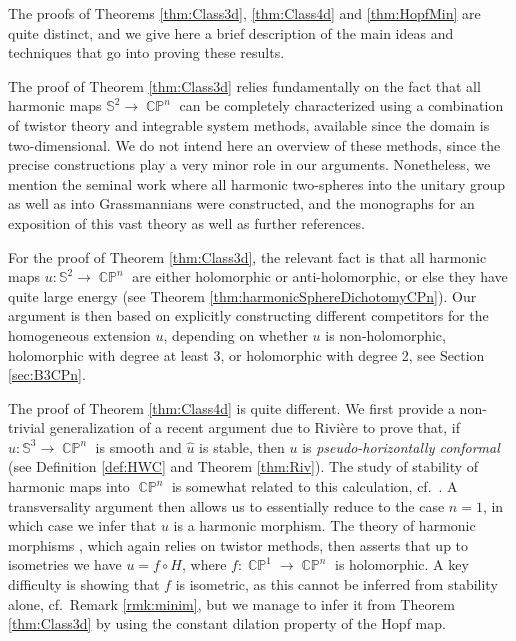\documentclass[11pt]{article}
\theoremstyle{plain}
\numberwithin{equation}{section}
\theoremstyle{definition}
\def \mb{\mathbb}
\DeclareMathOperator{\CP}{\mathbb{CP}}
\begin{document}
\medskip

The proofs of Theorems \ref{thm:Class3d}, \ref{thm:Class4d} and \ref{thm:HopfMin} are quite distinct, and we give here a brief description of the main ideas and techniques  that go into proving these results. 

The proof of Theorem \ref{thm:Class3d} relies fundamentally on the fact that all harmonic maps $\mb S^2\to \CP^n$ can be completely characterized \cite{Eells1983} using a combination of twistor theory and integrable system methods, available since the domain is two-dimensional. We do not intend here an overview of these methods, since the precise constructions play a very minor role in our arguments. Nonetheless, we mention the seminal work \cite{Uhlenbeck1989} where all harmonic two-spheres into the unitary group as well as into Grassmannians were constructed, and the monographs \cite{Burstall1990,Helein2001} for an exposition of this vast theory as well as further references. 

For the proof of Theorem \ref{thm:Class3d}, the relevant fact is that all harmonic maps $u\colon \mb S^2\to \CP^n$ are either holomorphic or anti-holomorphic, or else they have quite large energy (see Theorem \ref{thm:harmonicSphereDichotomyCPn}). Our argument is then based on explicitly constructing different competitors for the homogeneous extension $u$, depending on whether $u$ is non-holomorphic, holomorphic with degree at least 3, or holomorphic with degree 2, see Section \ref{sec:B3CPn}. 

The proof of Theorem \ref{thm:Class4d} is quite different. We first provide a non-trivial generalization of a recent argument due to Rivière \cite{Riviere2023} to prove that, if $u\colon \mb S^3\to \CP^n$ is smooth and $\hat u$ is stable, then $u$ is \textit{pseudo-horizontally conformal} (see Definition \ref{def:HWC} and Theorem \ref{thm:Riv}). The study of stability of harmonic maps into $\CP^n$ is somewhat related to this calculation, cf.\ \cite{Burns1989,Chen1996,Lawson1973}. A transversality argument then allows us to essentially reduce to the case $n=1$, in which case we infer that $u$ is a harmonic morphism. The theory of harmonic morphisms \cite{Baird2003}, which again relies on twistor methods, then asserts that up to isometries we have $u=f\circ H$, where $f\colon \CP^1\to \CP^n$ is holomorphic. A key difficulty is showing that $f$ is isometric, as this cannot be inferred from stability alone, cf.\ Remark \ref{rmk:minim}, but we manage to infer it from Theorem \ref{thm:Class3d} by using the constant dilation property of the Hopf map.
\end{document}
